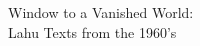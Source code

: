 \chapter*{}
\vspace{10em}
\thispagestyle{empty}
\begin{center}
{\fontsize{36}{36}\selectfont Window to a Vanished World: \\
Lahu Texts from the 1960’s}
\end{center}